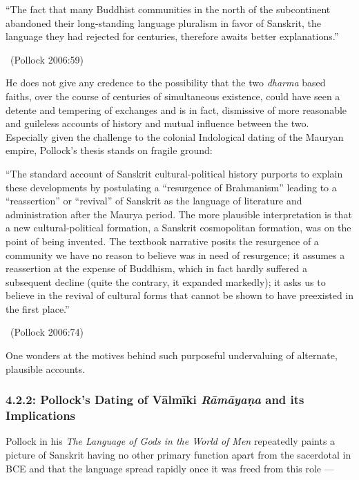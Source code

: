 \begin{myquote}
“The fact that many Buddhist communities in the north of the subcontinent abandoned their long-standing language pluralism in favor of Sanskrit, the language they had rejected for centuries, therefore awaits better explanations.” 

~\hfill (Pollock 2006:59)
\end{myquote}

He does not give any credence to the possibility that the two \textit{dharma} based faiths, over the course of centuries of simultaneous existence, could have seen a detente and tempering of exchanges and is in fact, dismissive of more reasonable and guileless accounts of history and mutual influence between the two. Especially given the challenge to the colonial Indological dating of the Mauryan empire, Pollock’s thesis stands on fragile ground:

\begin{myquote}
“The standard account of Sanskrit cultural-political history purports to explain these developments by postulating a “resurgence of Brahmanism” leading to a “reassertion” or “revival” of Sanskrit as the language of literature and administration after the Maurya period. The more plausible interpretation is that a new cultural-political formation, a Sanskrit cosmopolitan formation, was on the point of being invented. The textbook narrative posits the resurgence of a community we have no reason to believe was in need of resurgence; it assumes a reassertion at the expense of Buddhism, which in fact hardly suffered a subsequent decline (quite the contrary, it expanded markedly); it asks us to believe in the revival of cultural forms that cannot be shown to have preexisted in the first place.” 

~\hfill (Pollock 2006:74)
\end{myquote}

One wonders at the motives behind such purposeful undervaluing of alternate, plausible accounts.

\vspace{-.4cm}

\subsubsection*{4.2.2: Pollock’s Dating of Vālmīki \textit{Rāmāyaṇa} and its Implications}

\vspace{-.2cm}

Pollock in his \textit{The Language of Gods in the World of Men} repeatedly paints a picture of Sanskrit having no other primary function apart from the sacerdotal in BCE and that the language spread rapidly once it was freed from this role —

